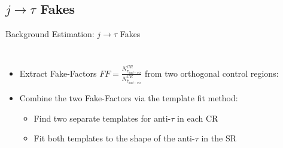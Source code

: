 \documentclass[aspectratio=169,xcolor=table]{beamer}
\begin{document}
\subsection{ $j \rightarrow \tau$ Fakes }

    \begin{frame}[t]{Background Estimation: $j \rightarrow \tau$ Fakes}
      \begin{columns}[t]
        \vspace{-3.5cm}
        \begin{itemize}
          \item Extract Fake-Factors $FF = \frac{N^{CR}_{\tau_{had-vis}}}{N^{CR}_{\bar{\tau}_{had-vis}}}$ from two orthogonal control regions:
            \begin{table}
              \tiny
            \end{table}
          \item Combine the two Fake-Factors via the template fit method:
          \begin{itemize}
            \item Find two separate templates for anti-$\tau$ in each CR
            \item Fit both templates to the shape of the anti-$\tau$ in the SR

\end{itemize}
\end{itemize}
\end{columns}
\end{frame}
\end{document}
